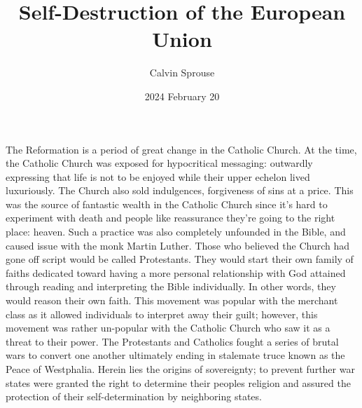 \documentclass[a4paper, 12pt]{article}
\title{Self-Destruction of the European Union}
\author{Calvin Sprouse}
\affil{Geography 101 World Regional Geography}
\date{2024 February 20}
\begin{document}
\maketitle

The Reformation is a period of great change in the Catholic Church. At the time, the Catholic Church was exposed for hypocritical messaging: outwardly expressing that life is not to be enjoyed while their upper echelon lived luxuriously. The Church also sold indulgences, forgiveness of sins at a price. This was the source of fantastic wealth in the Catholic Church since it's hard to experiment with death and people like reassurance they're going to the right place: heaven. Such a practice was also completely unfounded in the Bible, and caused issue with the monk Martin Luther. Those who believed the Church had gone off script would be called Protestants. They would start their own family of faiths dedicated toward having a more personal relationship with God attained through reading and interpreting the Bible individually. In other words, they would reason their own faith. This movement was popular with the merchant class as it allowed individuals to interpret away their guilt; however, this movement was rather un-popular with the Catholic Church who saw it as a threat to their power. The Protestants and Catholics fought a series of brutal wars to convert one another ultimately ending in stalemate truce known as the Peace of Westphalia. Herein lies the origins of sovereignty; to prevent further war states were granted the right to determine their peoples religion and assured the protection of their self-determination by neighboring states.
\end{document}
